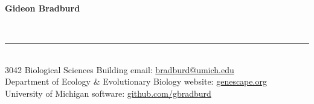 \documentclass{article}
\begin{document}
\thispagestyle{empty}
%
\begin{huge}
\bf{Gideon Bradburd}\
\end{huge}
\vspace{-0.25cm}
\\
%
\vspace{-0.7cm}
\rule{470pt}{0.4pt}
\vspace{0.3cm}
%
\\
3042 Biological Sciences Building \hfill email: \href{mailto:bradburd@umich.edu}{bradburd@umich.edu}\\
Department of Ecology \& Evolutionary Biology \hfill website: \href{http://genescape.org}{genescape.org}\\
University of Michigan \hfill software: \href{https://github.com/gbradburd}{github.com/gbradburd}\\

\vspace{-0.25cm}
\end{document}
